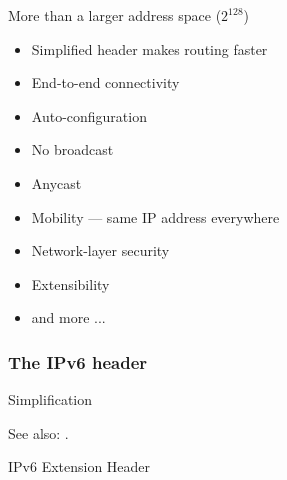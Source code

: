 \begin{frame}
  \begin{block}{More than a larger address space ($2^{128}$)}
    \begin{itemize}
    \item Simplified header makes routing faster
    \item End-to-end connectivity
    \item Auto-configuration
    \item No broadcast
    \item Anycast
    \item Mobility --- same IP address everywhere
    \item Network-layer security
    \item Extensibility
    \item and more ...
    \end{itemize}
  \end{block}
\end{frame}

\subsubsection{The IPv6 header}


\begin{frame}{Simplification}
  \begin{center}
  \end{center}
\end{frame}


See also: .

\begin{frame}{IPv6 Extension Header}
  \begin{center}
  \end{center}
\end{frame}

